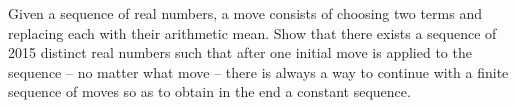 Given a sequence of real numbers, a move consists of choosing two terms and replacing each with their arithmetic mean. Show that there exists a sequence of 2015 distinct real numbers such that after one initial move is applied to the sequence -- no matter what move -- there is always a way to continue with a finite sequence of moves so as to obtain in the end a constant sequence.